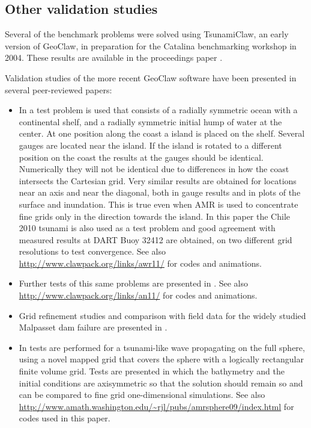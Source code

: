 \subsection{Other validation studies}

Several of the benchmark problems were solved using TsunamiClaw, an early
version of GeoClaw, in preparation for the Catalina
benchmarking workshop in 2004.  These results are available in the
proceedings paper \cite{rjl-george:catalina04a}.

Validation studies of the more 
recent GeoClaw software have been presented in several
peer-reviewed papers:

\begin{itemize}
\item In \cite{BergerGeorgeLeVequeMandli:awr11} a test problem is used that
consists of a radially symmetric ocean with a continental shelf, and
a radially symmetric initial
hump of water at the center.  At one position along the coast a 
island is placed on the shelf.  Several gauges are located near the island.
If the island is rotated to a different position on the coast the results at
the gauges should be identical.  Numerically they will not be identical due
to differences in how the coast intersects the Cartesian grid.  Very similar
results are obtained for locations near an axis and near the diagonal, both
in gauge results and in plots of the surface and inundation.  This is true
even when AMR is used to concentrate fine grids only in the direction
towards the island.  In this paper the Chile 2010 tsunami is also used as a
test problem and good agreement with measured results at DART Buoy 32412
are obtained, on two different grid resolutions to test convergence.
See also 
\url{http://www.clawpack.org/links/awr11/}
for codes and animations.


\item Further tests of this same problems are presented in
\cite{LeVequeGeorgeBerger:an11}.  
See also 
\url{http://www.clawpack.org/links/an11/}
for codes and animations.

\item Grid refinement studies and comparison with field data for the widely
studied Malpasset dam failure are presented in \cite{George:Malpasset}.

\item In \cite{mjb-dac-ch-rjl:amrsphere09} tests are performed for a
tsunami-like wave propagating on the full sphere, using a novel mapped grid
that covers the sphere with a logically rectangular finite volume grid.
Tests are presented in which the bathymetry and the initial conditions are
axisymmetric so that the solution should remain so and can be compared to
fine grid one-dimensional simulations.  
See also 
\url{http://www.amath.washington.edu/~rjl/pubs/amrsphere09/index.html}
for codes used in this paper.
\end{itemize} 



